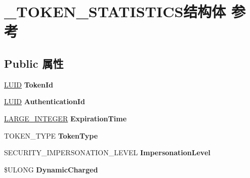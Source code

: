 \hypertarget{struct___t_o_k_e_n___s_t_a_t_i_s_t_i_c_s}{}\section{\+\_\+\+T\+O\+K\+E\+N\+\_\+\+S\+T\+A\+T\+I\+S\+T\+I\+C\+S结构体 参考}
\label{struct___t_o_k_e_n___s_t_a_t_i_s_t_i_c_s}
\subsection*{Public 属性}
\begin{DoxyCompactItemize}
\item 
\mbox{\label{struct___t_o_k_e_n___s_t_a_t_i_s_t_i_c_s_a273a353d4d677c47d40299253fa30025}} 
\hyperlink{struct___l_u_i_d}{L\+U\+ID} {\bfseries Token\+Id}
\item 
\mbox{\label{struct___t_o_k_e_n___s_t_a_t_i_s_t_i_c_s_a1e690af0e87d3056b0bb276b59ae8517}} 
\hyperlink{struct___l_u_i_d}{L\+U\+ID} {\bfseries Authentication\+Id}
\item 
\mbox{\label{struct___t_o_k_e_n___s_t_a_t_i_s_t_i_c_s_a60cf73750fdd2ad18a4a45de6f485c24}} 
\hyperlink{union___l_a_r_g_e___i_n_t_e_g_e_r}{L\+A\+R\+G\+E\+\_\+\+I\+N\+T\+E\+G\+ER} {\bfseries Expiration\+Time}
\item 
\mbox{\label{struct___t_o_k_e_n___s_t_a_t_i_s_t_i_c_s_a305d4b30ece69ba37da5b164e4cbed57}} 
T\+O\+K\+E\+N\+\_\+\+T\+Y\+PE {\bfseries Token\+Type}
\item 
\mbox{\label{struct___t_o_k_e_n___s_t_a_t_i_s_t_i_c_s_a48bbd586762c0606c4a18805d377688c}} 
S\+E\+C\+U\+R\+I\+T\+Y\+\_\+\+I\+M\+P\+E\+R\+S\+O\+N\+A\+T\+I\+O\+N\+\_\+\+L\+E\+V\+EL {\bfseries Impersonation\+Level}
\item 
\mbox{\label{struct___t_o_k_e_n___s_t_a_t_i_s_t_i_c_s_ae4eb5f283ab0f2de8a896982d58bd38b}} 
\$U\+L\+O\+NG {\bfseries Dynamic\+Charged}
\item 
\mbox{\label{struct___t_o_k_e_n___s_t_a_t_i_s_t_i_c_s_ac3c34a0dc7c3d8df048f51a9fbe69437}} 

\end{DoxyCompactItemize}
